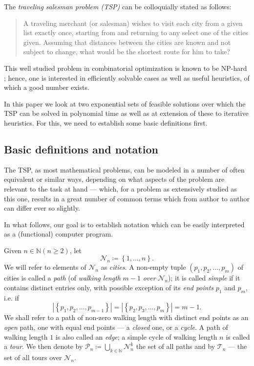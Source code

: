 \documentclass[titlepage,twoside,index=totoc,bibliography=totoc]{scrartcl}
\newcommand{\annotation}[1]{\marginpar{\small\itshape\color{green}#1}}
\numberwithin{equation}{section}
\numberwithin{figure}{section}
\numberwithin{table}{section}
\let\defstyle\itshape
\begin{document}
The {\defstyle traveling salesman problem (TSP)} can be colloquially stated as follows:
\blockquote{%
  A traveling merchant (or salesman) wishes to visit each city from a given
  list exactly once, starting from and returning to any select one of the cities
  given.  Assuming that distances between the cities are known and not
  subject to change, what would be the shortest route for him to take?
}
This well studied problem in combinatorial optimization is known to be
NP-hard \cite{Karp72}; hence, one is interested in efficiently solvable
cases as well as useful heuristics, of which a good number exists.

In this paper we look at two exponential sets of feasible solutions over
which the TSP can be solved in polynomial time as well as at extension
of these to iterative heuristics.  For this, we need to establish some basic
definitions first.

\subsection{Basic definitions and notation}

The TSP, as most mathematical problems, can be modeled in a number of often
equivalent or similar ways, depending on what aspects of the problem are
relevant to the task at hand --- which, for a problem as extensively studied
as this one, results in a great number of common terms which from author to
author can differ ever so slightly.

In what follows, our goal is to establish notation which can be easily
interpreted as a (functional) computer program.

\begin{define}
Given $n \in \mathbb{N} \left(n \geq 2\right)$,
let \[\mathcal{N}_n \coloneqq \left\{1,\ldots,n\right\}.\]
We will refer to elements of $\mathcal{N}_n$ as {\defstyle cities}.
A non-empty tuple $\left(p_1,p_2,\ldots,p_m\right)$
of cities is called a {\defstyle path} (of {\defstyle walking length} $m-1$
{\defstyle over} $\mathcal{N}_n$);
it is called {\defstyle simple} if it contains distinct entries only, with
possible exception of its {\defstyle end points} $p_1$ and $p_m$, i.e. if
\[\left|\left\{p_1,p_2,\ldots,p_{m-1}\right\}\right| =
\left|\left\{p_2,p_3,\ldots,p_{m}\right\}\right| = m-1.\]  We shall refer to
a path of non-zero walking length with distinct end points as an {\defstyle open} path,
one with equal end points --- a {\defstyle closed} one, or a {\defstyle cycle}.
A path of walking length $1$ is also called an {\defstyle edge};
a simple cycle of walking length $n$ is called a {\defstyle tour}.
We then denote by
$\mathcal{P}_n \coloneqq \bigcup_{k \in \mathbb{N}}\mathcal{N}_n^k$
the set of all paths and by
$\mathcal{T}_n$ --- the set of all tours over $\mathcal{N}_n$.
\end{define}
\end{document}
